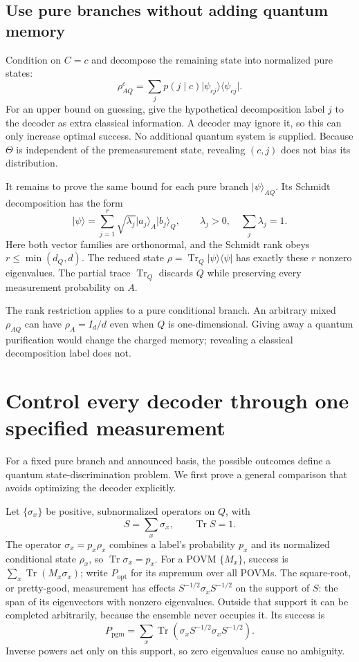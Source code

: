 \documentclass[11pt,a4paper]{article}
\newcommand{\Tr}{\operatorname{Tr}}
\newcommand{\ket}[1]{\lvert #1\rangle}
\newcommand{\bra}[1]{\langle #1\rvert}
\newcommand{\pgm}{P_{\mathrm{pgm}}}
\newcommand{\popt}{P_{\mathrm{opt}}}
\newcommand{\newsection}[1]{\section{#1}}
\begin{document}
\subsection{Use pure branches without adding quantum memory}
Condition on $C=c$ and decompose the remaining state into normalized pure states:
\[
\rho_{AQ}^{c}=\sum_j p(j\mid c)\ket{\psi_{cj}}\bra{\psi_{cj}}.
\]
For an upper bound on guessing, give the hypothetical decomposition label $j$ to the decoder as extra classical information. A decoder may ignore it, so this can only increase optimal success. No additional quantum system is supplied. Because $\Theta$ is independent of the premeasurement state, revealing $(c,j)$ does not bias its distribution.

It remains to prove the same bound for each pure branch $\ket\psi_{AQ}$. Its Schmidt decomposition has the form
\begin{equation}\label{eq:schmidt}
\ket\psi=\sum_{j=1}^{r}\sqrt{\lambda_j}\ket{a_j}_A\ket{b_j}_Q,
\qquad\lambda_j>0,\quad\sum_j\lambda_j=1.
\end{equation}
Here both vector families are orthonormal, and the Schmidt rank obeys $r\leq\min(d_Q,d)$. The reduced state $\rho=\Tr_Q\ket\psi\bra\psi$ has exactly these $r$ nonzero eigenvalues. The partial trace $\Tr_Q$ discards $Q$ while preserving every measurement probability on $A$.

\begin{keybox}
The rank restriction applies to a pure conditional branch. An arbitrary mixed $\rho_{AQ}$ can have $\rho_A=I_d/d$ even when $Q$ is one-dimensional. Giving away a quantum purification would change the charged memory; revealing a classical decomposition label does not.
\end{keybox}

\newsection{Control every decoder through one specified measurement}
For a fixed pure branch and announced basis, the possible outcomes define a quantum state-discrimination problem. We first prove a general comparison that avoids optimizing the decoder explicitly.

Let $\{\sigma_x\}$ be positive, subnormalized operators on $Q$, with
\[
S=\sum_x\sigma_x,\qquad\Tr S=1.
\]
The operator $\sigma_x=p_x\rho_x$ combines a label's probability $p_x$ and its normalized conditional state $\rho_x$, so $\Tr\sigma_x=p_x$. For a POVM $\{M_x\}$, success is $\sum_x\Tr(M_x\sigma_x)$; write $\popt$ for its supremum over all POVMs. The square-root, or pretty-good, measurement has effects $S^{-1/2}\sigma_xS^{-1/2}$ on the support of $S$: the span of its eigenvectors with nonzero eigenvalues. Outside that support it can be completed arbitrarily, because the ensemble never occupies it. Its success is
\begin{equation}\label{eq:pgm-def}
\pgm=\sum_x\Tr(\sigma_xS^{-1/2}\sigma_xS^{-1/2}).
\end{equation}
Inverse powers act only on this support, so zero eigenvalues cause no ambiguity.
\end{document}
